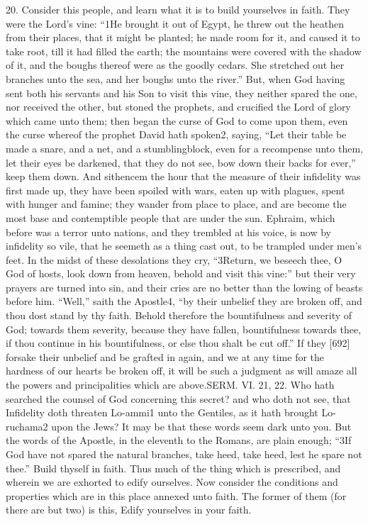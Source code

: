 20. Consider this people, and learn what it is to build yourselves in faith. They were the Lord’s vine: “1He brought it out of Egypt, he threw out the heathen from their places, that it might be planted; he made room for it, and caused it to take root, till it had filled the earth; the mountains were covered with the shadow of it, and the boughs thereof were as the goodly cedars. She stretched out her branches unto the sea, and her boughs unto the river.” But, when God having sent both his servants and his Son to visit this vine, they neither spared the one, nor received the other, but stoned the prophets, and crucified the Lord of glory which came unto them; then began the curse of God to come upon them, even the curse whereof the prophet David hath spoken2, saying, “Let their table be made a snare, and a net, and a stumblingblock, even for a recompense unto them, let their eyes be darkened, that they do not see, bow down their backs for ever,” keep them down. And sithencem the hour that the measure of their infidelity was first made up, they have been spoiled with wars, eaten up with plagues, spent with hunger and famine; they wander from place to place, and are become the most base and contemptible people that are under the sun. Ephraim, which before was a terror unto nations, and they trembled at his voice, is now by infidelity so vile, that he seemeth as a thing cast out, to be trampled under men’s feet. In the midst of these desolations they cry, “3Return, we beseech thee, O God of hosts, look down from heaven, behold and visit this vine:” but their very prayers are turned into sin, and their cries are no better than the lowing of beasts before him. “Well,” saith the Apostle4, “by their unbelief they are broken off, and thou dost stand by thy faith. Behold therefore the bountifulness and severity of God; towards them severity, because they have fallen, bountifulness towards thee, if thou continue in his bountifulness, or else thou shalt be cut off.” If they [692] forsake their unbelief and be grafted in again, and we at any time for the hardness of our hearts be broken off, it will be such a judgment as will amaze all the powers and principalities which are above.SERM. VI. 21, 22. Who hath searched the counsel of God concerning this secret? and who doth not see, that Infidelity doth threaten Lo-ammi1 unto the Gentiles, as it hath brought Lo-ruchama2 upon the Jews? It may be that these words seem dark unto you. But the words of the Apostle, in the eleventh to the Romans, are plain enough; “3If God have not spared the natural branches, take heed, take heed, lest he spare not thee.” Build thyself in faith. Thus much of the thing which is prescribed, and wherein we are exhorted to edify ourselves. Now consider the conditions and properties which are in this place annexed unto faith. The former of them (for there are but two) is this, Edify yourselves in your faith.


